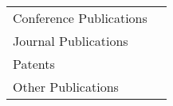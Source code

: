 
\begin{center}
    \begin{tabularx}{0.5\linewidth}{lR}
        \toprule
        Conference Publications & \numconfpubs{} \\ 
        Journal Publications & \numjournalpubs{} \\ 
        Patents & \numpatentpubs{} \\ 
        Other Publications & \numotherpubs{} \\ 
        \bottomrule
    \end{tabularx}
\end{center}
    